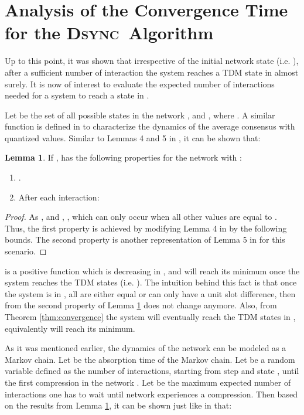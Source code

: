 \documentclass[conference]{IEEEtran}
\newcommand{\DDD}{\textsc{Dsync~}}
\theoremstyle{definition}
\theoremstyle{definition}
\newtheorem{lemma}{Lemma}
\begin{document}
\section{Analysis of the Convergence Time for the \DDD Algorithm}\label{sec:time}
Up to this point, it was shown that irrespective of the initial network state (i.e. ), after a sufficient number of interaction the system reaches a TDM state in  almost surely. It is now of interest to evaluate the expected number of interactions  needed for a system to reach a state in . 

Let  be the set of all possible states in the network , and \mbox{}, where . A similar function is defined in \cite{quant} to characterize the dynamics of the average consensus with quantized values.
Similar to Lemmas 4 and 5 in \cite{quant}, it can be shown that:
\begin{lemma}\label{remark1}
If ,  has the following properties for the network  with :
\begin{enumerate}
\item .
\item After each interaction: 

\end{enumerate} 
\end{lemma}
\begin{proof} As , and , , which can only occur when all other values are equal to . Thus, the first property is achieved by modifying Lemma 4 in \cite{quant} by the following bounds. The second property is another representation of Lemma 5 in \cite{quant} for this scenario.\end{proof}

 is a positive function which is decreasing in , and will reach its minimum once the system reaches the TDM states (i.e. ). The intuition behind this fact is that once the system is in , all  are either equal or can only have a unit slot difference, then from the second property of Lemma \ref{remark1}  does not change anymore. Also, from Theorem \ref{thm:convergence} the system will eventually reach the TDM states in , equivalently  will reach its minimum.

As it was mentioned earlier, the dynamics of the network  can be modeled as a Markov chain. Let  be the absorption time of the Markov chain. Let   be a random variable defined as the number of interactions, starting from step  and state , until the first compression in the network . Let  be the maximum expected number of interactions one has to wait until network  experiences a compression. Then based on the results from Lemma \ref{remark1}, it can be shown just like in \cite{quant} that:
\end{document}
